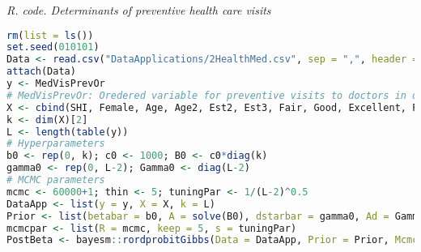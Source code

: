 \begin{tcolorbox}[enhanced,width=4.67in,center upper,
	fontupper=\large\bfseries,drop shadow southwest,sharp corners]
	\textit{R. code. Determinants of preventive health care visits}
	\begin{VF}
		\begin{lstlisting}[language=R]		
rm(list = ls())
set.seed(010101)
Data <- read.csv("DataApplications/2HealthMed.csv", sep = ",", header = TRUE, fileEncoding = "latin1")
attach(Data)
y <- MedVisPrevOr 
# MedVisPrevOr: Oredered variable for preventive visits to doctors in one year: 1 (none), 2 (once), ... 6 (five or more)
X <- cbind(SHI, Female, Age, Age2, Est2, Est3, Fair, Good, Excellent, PriEd, HighEd, VocEd, UnivEd)
k <- dim(X)[2]
L <- length(table(y))
# Hyperparameters
b0 <- rep(0, k); c0 <- 1000; B0 <- c0*diag(k)
gamma0 <- rep(0, L-2); Gamma0 <- diag(L-2)
# MCMC parameters
mcmc <- 60000+1; thin <- 5; tuningPar <- 1/(L-2)^0.5
DataApp <- list(y = y, X = X, k = L)
Prior <- list(betabar = b0, A = solve(B0), dstarbar = gamma0, Ad = Gamma0)
mcmcpar <- list(R = mcmc, keep = 5, s = tuningPar)
PostBeta <- bayesm::rordprobitGibbs(Data = DataApp, Prior = Prior, Mcmc = mcmcpar)
\end{lstlisting}
	\end{VF}
\end{tcolorbox} 


